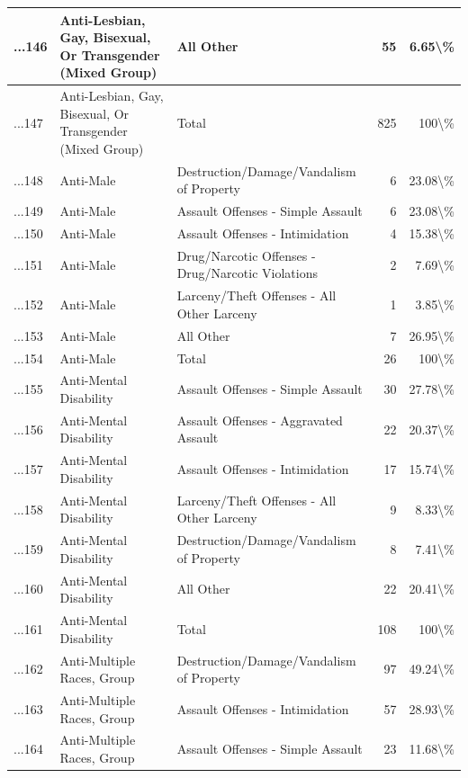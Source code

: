 \documentclass[
]{krantz}
\begin{document}
\begin{longtable}[t]{l|l|l|r|r}
\hline
...146 & Anti-Lesbian, Gay, Bisexual, Or Transgender (Mixed Group) & All Other & 55 & 6.65\textbackslash{}\%\\
\hline
...147 & Anti-Lesbian, Gay, Bisexual, Or Transgender (Mixed Group) & Total & 825 & 100\textbackslash{}\%\\
\hline
...148 & Anti-Male & Destruction/Damage/Vandalism of Property & 6 & 23.08\textbackslash{}\%\\
\hline
...149 & Anti-Male & Assault Offenses - Simple Assault & 6 & 23.08\textbackslash{}\%\\
\hline
...150 & Anti-Male & Assault Offenses - Intimidation & 4 & 15.38\textbackslash{}\%\\
\hline
...151 & Anti-Male & Drug/Narcotic Offenses - Drug/Narcotic Violations & 2 & 7.69\textbackslash{}\%\\
\hline
...152 & Anti-Male & Larceny/Theft Offenses - All Other Larceny & 1 & 3.85\textbackslash{}\%\\
\hline
...153 & Anti-Male & All Other & 7 & 26.95\textbackslash{}\%\\
\hline
...154 & Anti-Male & Total & 26 & 100\textbackslash{}\%\\
\hline
...155 & Anti-Mental Disability & Assault Offenses - Simple Assault & 30 & 27.78\textbackslash{}\%\\
\hline
...156 & Anti-Mental Disability & Assault Offenses - Aggravated Assault & 22 & 20.37\textbackslash{}\%\\
\hline
...157 & Anti-Mental Disability & Assault Offenses - Intimidation & 17 & 15.74\textbackslash{}\%\\
\hline
...158 & Anti-Mental Disability & Larceny/Theft Offenses - All Other Larceny & 9 & 8.33\textbackslash{}\%\\
\hline
...159 & Anti-Mental Disability & Destruction/Damage/Vandalism of Property & 8 & 7.41\textbackslash{}\%\\
\hline
...160 & Anti-Mental Disability & All Other & 22 & 20.41\textbackslash{}\%\\
\hline
...161 & Anti-Mental Disability & Total & 108 & 100\textbackslash{}\%\\
\hline
...162 & Anti-Multiple Races, Group & Destruction/Damage/Vandalism of Property & 97 & 49.24\textbackslash{}\%\\
\hline
...163 & Anti-Multiple Races, Group & Assault Offenses - Intimidation & 57 & 28.93\textbackslash{}\%\\
\hline
...164 & Anti-Multiple Races, Group & Assault Offenses - Simple Assault & 23 & 11.68\textbackslash{}\%\\

\end{longtable}
\end{document}
